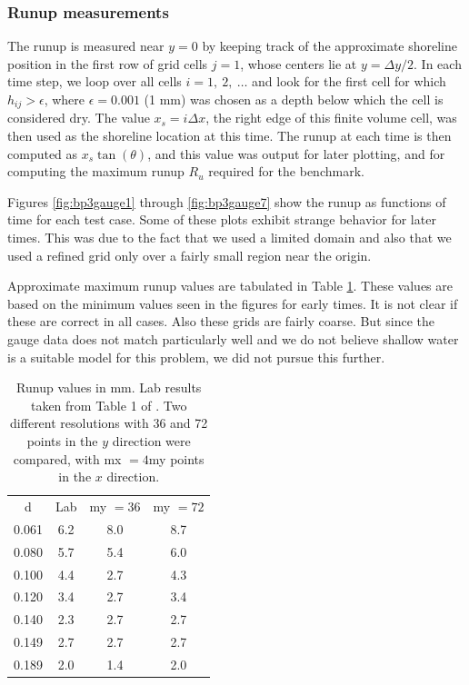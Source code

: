 \subsubsection{Runup measurements}

The runup is measured near $y=0$ by keeping track of the approximate shoreline
position in the first row of grid cells $j=1$, whose centers lie at
$y=\Delta y / 2$.  In each time step, we loop over all cells
$i=1,~2,~\ldots$ and look for the first cell for which $h_{ij} > \epsilon$,
where $\epsilon = 0.001$ (1 mm) was chosen as a depth below which the cell
is considered dry.  
The value $x_s = i\Delta x$, the right edge of this finite volume cell, was
then used as the shoreline location at this time.  The runup at each time
is then computed as $x_s\tan(\theta)$, and this value was output for
later plotting, and for computing the maximum runup $R_u$ required for the
benchmark.

Figures \ref{fig:bp3gauge1} through \ref{fig:bp3gauge7} show the 
runup as functions of time for each test case.  
Some of these plots exhibit strange
behavior for later times.  This was due to the fact that we used a limited
domain and also that we used a refined grid only over a fairly small region
near the origin.  

Approximate maximum runup values are
tabulated in Table \ref{fig:bp3runup}.  These values are based on the 
minimum values seen in the figures for early times.  It is not clear if
these are correct in all cases.  Also these grids are fairly coarse.  But
since the gauge data does not match particularly well and we do not believe
shallow water is a suitable model for this problem, we did not pursue this
further.

\begin{table}[ht]
\hfil\begin{tabular}{c|c|c|c}
d & Lab & my $= 36$ & my $= 72$ \\
0.061&6.2&8.0 &8.7 \\
0.080&5.7&5.4 &6.0 \\
0.100&4.4&2.7 &4.3 \\
0.120&3.4&2.7 &3.4 \\
0.140&2.3&2.7 &2.7 \\
0.149&2.7&2.7 &2.7 \\
0.189&2.0&1.4 &2.0
\end{tabular}\hfil
\caption{\label{fig:bp3runup} 
Runup values in mm.  Lab results taken from Table 1 of
\cite{bp-description}. 
Two different resolutions with 36 and 72 points
in the $y$ direction were compared, with mx $= 4$my points in the $x$
direction.
  }
\end{table}



